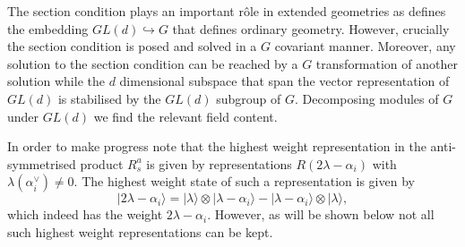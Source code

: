 The section condition plays an important rôle in extended geometries as defines the embedding $GL(d)\hookrightarrow G$ that defines ordinary geometry. However, crucially the section condition is posed and solved in a $G$ covariant manner. Moreover, any solution to the section condition can be reached by a $G$ transformation of another solution while the $d$ dimensional subspace that span the vector representation of $GL(d)$ is stabilised by the $GL(d)$ subgroup of $G$. Decomposing modules of $G$ under $GL(d)$ we find the relevant field content.

In order to make progress note that the highest weight representation in the anti-symmetrised product $R_s^a$ is given by representations $R(2\lambda-\alpha_i)$ with $\lambda(\alpha^\vee_i)\neq 0$. The highest weight state of such a representation is given by
\begin{equation}
    |2\lambda-\alpha_i\rangle = |\lambda\rangle \otimes |\lambda-\alpha_i\rangle - |\lambda-\alpha_i\rangle \otimes |\lambda\rangle,
\end{equation}
which indeed has the weight $2\lambda-\alpha_i$. However, as will be shown below not all such highest weight representations can be kept.

